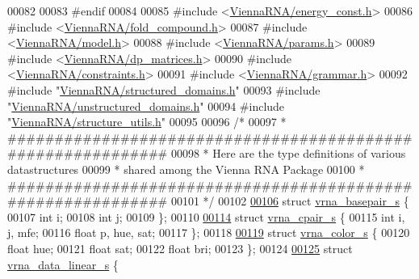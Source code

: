 \begin{DoxyCode}
00082 
00083 \textcolor{preprocessor}{#endif}
00084 
00085 \textcolor{preprocessor}{#include <\hyperlink{energy__const_8h}{ViennaRNA/energy\_const.h}>}
00086 \textcolor{preprocessor}{#include <\hyperlink{fold__compound_8h}{ViennaRNA/fold\_compound.h}>}
00087 \textcolor{preprocessor}{#include <\hyperlink{model_8h}{ViennaRNA/model.h}>}
00088 \textcolor{preprocessor}{#include <\hyperlink{params_8h}{ViennaRNA/params.h}>}
00089 \textcolor{preprocessor}{#include <\hyperlink{dp__matrices_8h}{ViennaRNA/dp\_matrices.h}>}
00090 \textcolor{preprocessor}{#include <\hyperlink{constraints_8h}{ViennaRNA/constraints.h}>}
00091 \textcolor{preprocessor}{#include <\hyperlink{grammar_8h}{ViennaRNA/grammar.h}>}
00092 \textcolor{preprocessor}{#include "\hyperlink{structured__domains_8h}{ViennaRNA/structured\_domains.h}"}
00093 \textcolor{preprocessor}{#include "\hyperlink{unstructured__domains_8h}{ViennaRNA/unstructured\_domains.h}"}
00094 \textcolor{preprocessor}{#include "\hyperlink{structure__utils_8h}{ViennaRNA/structure\_utils.h}"}
00095 
00096 \textcolor{comment}{/*}
00097 \textcolor{comment}{ * ############################################################}
00098 \textcolor{comment}{ * Here are the type definitions of various datastructures}
00099 \textcolor{comment}{ * shared among the Vienna RNA Package}
00100 \textcolor{comment}{ * ############################################################}
00101 \textcolor{comment}{ */}
00102 
\hyperlink{group__data__structures}{00106} \textcolor{keyword}{struct }\hyperlink{group__data__structures_structvrna__basepair__s}{vrna\_basepair\_s} \{
00107   \textcolor{keywordtype}{int} i;
00108   \textcolor{keywordtype}{int} j;
00109 \};
00110 
\hyperlink{group__data__structures}{00114} \textcolor{keyword}{struct }\hyperlink{group__data__structures_structvrna__cpair__s}{vrna\_cpair\_s} \{
00115   \textcolor{keywordtype}{int}   i, j, mfe;
00116   \textcolor{keywordtype}{float} p, hue, sat;
00117 \};
00118 
\hyperlink{group__data__structures}{00119} \textcolor{keyword}{struct }\hyperlink{group__data__structures_structvrna__color__s}{vrna\_color\_s} \{
00120   \textcolor{keywordtype}{float} hue;
00121   \textcolor{keywordtype}{float} sat;
00122   \textcolor{keywordtype}{float} bri;
00123 \};
00124 
\hyperlink{group__data__structures}{00125} \textcolor{keyword}{struct }\hyperlink{group__data__structures_structvrna__data__linear__s}{vrna\_data\_linear\_s} \{

\end{DoxyCode}
